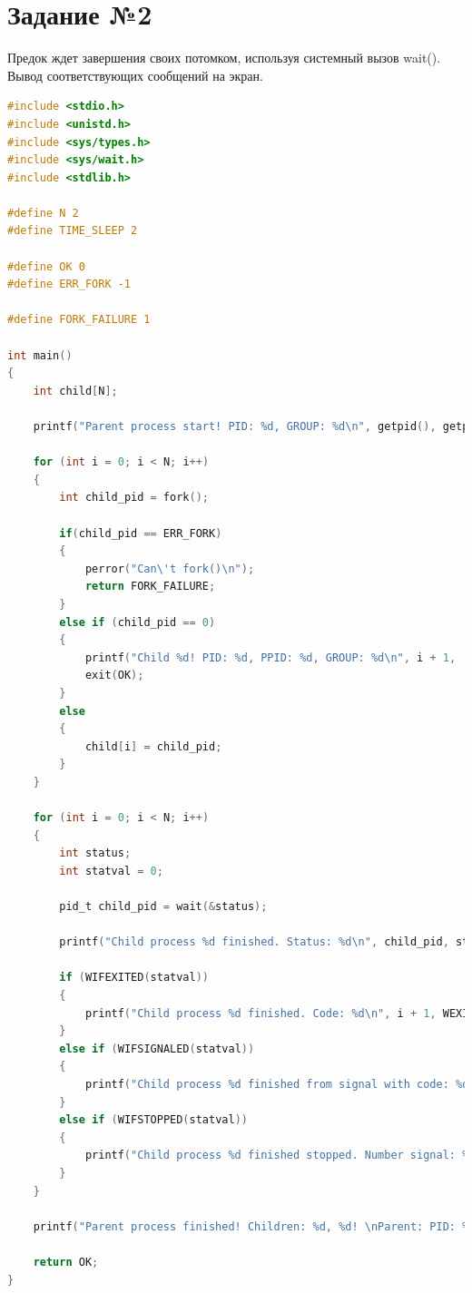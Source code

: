 \documentclass[12pt]{report}
\begin{document}
\section*{Задание №2}

Предок ждет завершения своих потомком, используя системный вызов
wait(). Вывод соответствующих сообщений на экран.

\begin{lstlisting}[label=some-code,caption=Вызов функции wait(),language=C]
#include <stdio.h>
#include <unistd.h>
#include <sys/types.h>
#include <sys/wait.h>
#include <stdlib.h>

#define N 2
#define TIME_SLEEP 2

#define OK 0
#define ERR_FORK -1

#define FORK_FAILURE 1

int main()
{
	int child[N];
	
	printf("Parent process start! PID: %d, GROUP: %d\n", getpid(), getpgrp());
	
	for (int i = 0; i < N; i++)
	{
		int child_pid = fork();
		
		if(child_pid == ERR_FORK)
		{
			perror("Can\'t fork()\n");
			return FORK_FAILURE;
		}
		else if (child_pid == 0)
		{
			printf("Child %d! PID: %d, PPID: %d, GROUP: %d\n", i + 1,   getpid(), getppid(), getpgrp());
			exit(OK);
		}     
		else
		{
			child[i] = child_pid;
		}   
	}
	
	for (int i = 0; i < N; i++)
	{
		int status;
		int statval = 0;
		
		pid_t child_pid = wait(&status);
		
		printf("Child process %d finished. Status: %d\n", child_pid, status);
		
		if (WIFEXITED(statval))
		{
			printf("Child process %d finished. Code: %d\n", i + 1, WEXITSTATUS(statval));
		}
		else if (WIFSIGNALED(statval))
		{
			printf("Child process %d finished from signal with code: %d\n", i + 1, WTERMSIG(statval));
		}
		else if (WIFSTOPPED(statval))
		{
			printf("Child process %d finished stopped. Number signal: %d\n", i + 1, WSTOPSIG(statval));
		}
	}
	
	printf("Parent process finished! Children: %d, %d! \nParent: PID: %d, GROUP: %d\n ", child[0], child[1], getpid(), getpgrp());
	
	return OK;
}
\end{lstlisting}
\end{document}
